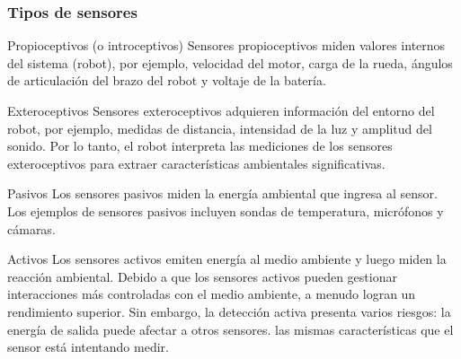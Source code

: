 \begin{frame}
    \frametitle{Tipos de sensores}
    \footnotesize
    
    \begin{block}{Propioceptivos (o introceptivos)}
        Sensores propioceptivos miden valores internos del sistema (robot), por ejemplo, velocidad del motor, carga de la rueda, ángulos de articulación del brazo del robot y voltaje de la batería.
    \end{block}

    \begin{block}{Exteroceptivos}
        Sensores exteroceptivos adquieren información del entorno del robot, por ejemplo, medidas de distancia, intensidad de la luz y amplitud del sonido. Por lo tanto, el robot interpreta las mediciones de los sensores exteroceptivos para extraer características ambientales significativas.
    \end{block}

    \begin{block}{Pasivos}
        Los sensores pasivos miden la energía ambiental que ingresa al sensor. Los ejemplos de sensores pasivos incluyen sondas de temperatura, micrófonos y cámaras.
    \end{block}


    \begin{block}{Activos}
        Los sensores activos emiten energía al medio ambiente y luego miden la reacción ambiental. Debido a que los sensores activos pueden gestionar interacciones más controladas con el medio ambiente, a menudo logran un rendimiento superior. Sin embargo, la detección activa presenta varios riesgos: la energía de salida puede afectar a otros sensores. las mismas características que el sensor está intentando medir.
        
    \end{block}


\end{frame}


